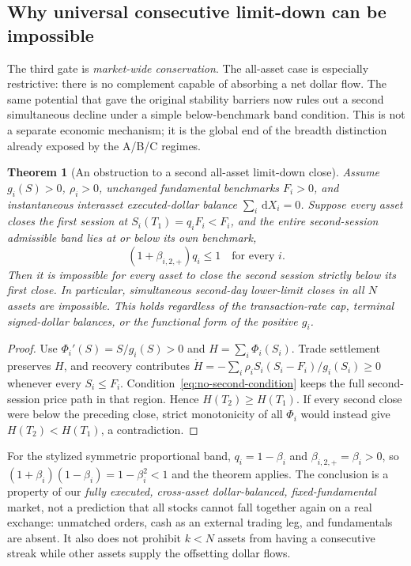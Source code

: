 \documentclass[11pt]{article}
\numberwithin{equation}{section}
\newtheorem{theorem}{Theorem}[section]
\theoremstyle{definition}
\theoremstyle{remark}
\newcommand{\dd}{\,\mathrm{d}}
\begin{document}
\subsection{Why universal consecutive limit-down can be impossible}\label{subsec:multiday-full}
The third gate is \emph{market-wide conservation}. The all-asset case is especially restrictive: there is no complement capable of absorbing a net dollar flow. The same potential that gave the original stability barriers now rules out a second simultaneous decline under a simple below-benchmark band condition. This is not a separate economic mechanism; it is the global end of the breadth distinction already exposed by the A/B/C regimes.
\begin{theorem}[An obstruction to a second all-asset limit-down close]\label{thm:no-second-global}
Assume $g_i(S)>0$, $\rho_i>0$, unchanged fundamental benchmarks $F_i>0$, and instantaneous interasset executed-dollar balance $\sum_i\dd X_i=0$. Suppose every asset closes the first session at $S_i(T_1)=q_iF_i<F_i$, and the \emph{entire second-session admissible band} lies at or below its own benchmark,
\begin{equation}\label{eq:no-second-condition}
 (1+\beta_{i,2,+})q_i\le1\quad\text{for every }i.
\end{equation}
Then it is impossible for \emph{every} asset to close the second session strictly below its first close. In particular, simultaneous second-day lower-limit closes in all $N$ assets are impossible. This holds regardless of the transaction-rate cap, terminal signed-dollar balances, or the functional form of the positive $g_i$.
\end{theorem}
\begin{proof}
Use $\Phi_i'(S)=S/g_i(S)>0$ and $H=\sum_i\Phi_i(S_i)$. Trade settlement preserves $H$, and recovery contributes
$\dot H=-\sum_i\rho_i S_i(S_i-F_i)/g_i(S_i)\ge0$ whenever every $S_i\le F_i$.
Condition~\eqref{eq:no-second-condition} keeps the full second-session price path in that region. Hence $H(T_2)\ge H(T_1)$. If every second close were below the preceding close, strict monotonicity of all $\Phi_i$ would instead give $H(T_2)<H(T_1)$, a contradiction.
\end{proof}

For the stylized symmetric proportional band, $q_i=1-\beta_i$ and
$\beta_{i,2,+}=\beta_i>0$, so
$(1+\beta_i)(1-\beta_i)=1-\beta_i^2<1$ and the theorem applies. The conclusion is a property of our \emph{fully executed, cross-asset dollar-balanced, fixed-fundamental} market, not a prediction that all stocks cannot fall together again on a real exchange: unmatched orders, cash as an external trading leg, and fundamentals are absent. It also does not prohibit $k<N$ assets from having a consecutive streak while other assets supply the offsetting dollar flows.
\end{document}
